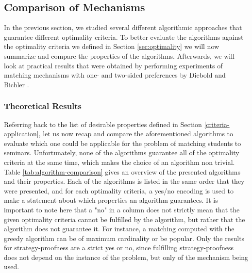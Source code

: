 \subsection{Comparison of Mechanisms}
In the previous section, we studied several different algorithmic approaches that guarantee different optimality criteria. To better evaluate the algorithms against the optimality criteria we defined in Section \ref{sec:optimality} we will now summarize and compare the properties of the algorithms. Afterwards, we will look at practical results that were obtained by performing experiments of matching mechanisms with one- and two-sided preferences by Diebold and Bichler \cite{DieboldBenchmark}.

\subsubsection{Theoretical Results}
Referring back to the list of desirable properties defined in Section \ref{criteria-application}, let us now recap and compare the aforementioned algorithms to evaluate which one could be applicable for the problem of matching students to seminars. Unfortunately, none of the algorithms guarantee all of the optimality criteria at the same time, which makes the choice of an algorithm non trivial. Table \ref{tab:algorithm-comparison} gives an overview of the presented algorithms and their properties. Each of the algorithms is listed in the same order that they were presented, and for each optimality criteria, a yes/no encoding is used to make a statement about which properties an algorithm guarantees. It is important to note here that a "no" in a column does not strictly mean that the given optimality criteria cannot be fulfilled by the algorithm, but rather that the algorithm does not guarantee it. For instance, a matching computed with the greedy algorithm can be of maximum cardinality or be popular. Only the results for strategy-proofness are a strict yes or no, since fulfilling strategy-proofness does not depend on the instance of the problem, but only of the mechanism being used. 

